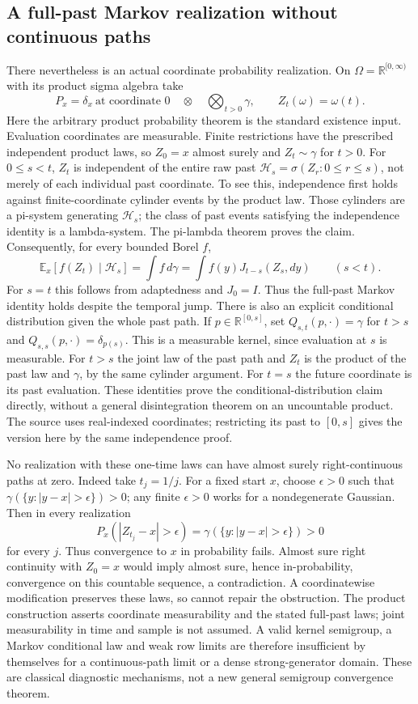 \documentclass[11pt]{article}
\newcommand{\R}{\mathbb R}\newcommand{\E}{\mathbb E}
\begin{document}
\subsection*{A full-past Markov realization without continuous paths}
There nevertheless is an actual coordinate probability realization.
On $\Omega=\R^{[0,\infty)}$ with its product sigma algebra take
\[
 P_x=\delta_x\ \text{at coordinate }0
           \quad\otimes\quad\bigotimes_{t>0}\gamma,
 \qquad Z_t(\omega)=\omega(t).
\]
Here the arbitrary product probability theorem is the standard
existence input. Evaluation coordinates are measurable. Finite
restrictions have the prescribed independent product laws, so
$Z_0=x$ almost surely and $Z_t\sim\gamma$ for $t>0$.
For $0\leq s<t$, $Z_t$ is independent of the entire raw past
$\mathcal H_s=\sigma(Z_r:0\leq r\leq s)$, not merely of each
individual past coordinate. To see this, independence first holds
against finite-coordinate cylinder events by the product law.
Those cylinders are a pi-system generating $\mathcal H_s$; the
class of past events satisfying the independence identity is a
lambda-system. The pi-lambda theorem proves the claim.
Consequently, for every bounded Borel $f$,
\[
 \E_x[f(Z_t)\mid\mathcal H_s]=\int f\,d\gamma
       =\int f(y)J_{t-s}(Z_s,dy)\qquad(s<t).
\]
For $s=t$ this follows from adaptedness and $J_0=I$.
Thus the full-past Markov identity holds despite the temporal jump.
There is also an explicit conditional distribution given the whole
past path. If $p\in\R^{[0,s]}$, set
$Q_{s,t}(p,\cdot)=\gamma$ for $t>s$ and
$Q_{s,s}(p,\cdot)=\delta_{p(s)}$.
This is a measurable kernel, since evaluation at $s$ is measurable.
For $t>s$ the joint law of the past path and $Z_t$ is the product
of the past law and $\gamma$, by the same cylinder argument.
For $t=s$ the future coordinate is its past evaluation.
These identities prove the conditional-distribution claim directly,
without a general disintegration theorem on an uncountable product.
The source uses real-indexed coordinates; restricting its past to
$[0,s]$ gives the version here by the same independence proof.

No realization with these one-time laws can have almost surely
right-continuous paths at zero. Indeed take $t_j=1/j$.
For a fixed start $x$, choose $\epsilon>0$ such that
$\gamma(\{y:|y-x|>\epsilon\})>0$; any finite $\epsilon>0$
works for a nondegenerate Gaussian. Then in every realization
\[
 P_x(|Z_{t_j}-x|>\epsilon)
   =\gamma(\{y:|y-x|>\epsilon\})>0
\]
for every $j$. Thus convergence to $x$ in probability fails.
Almost sure right continuity with $Z_0=x$ would imply almost sure,
hence in-probability, convergence on this countable sequence, a
contradiction. A coordinatewise modification preserves these laws,
so cannot repair the obstruction. The product construction asserts
coordinate measurability and the stated full-past laws; joint
measurability in time and sample is not assumed. A valid kernel
semigroup, a Markov conditional law and weak row limits are therefore
insufficient by themselves for a continuous-path limit or a dense
strong-generator domain. These are classical diagnostic mechanisms,
not a new general semigroup convergence theorem.
\end{document}
